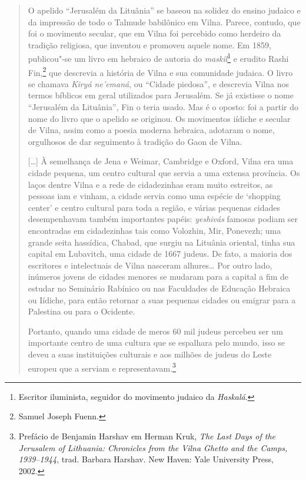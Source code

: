 \begin{quote}
O apelido ``Jerusalém da Lituânia'' se baseou na solidez do ensino
judaico e da impressão de todo o Talmude babilônico em Vilna. Parece,
contudo, que foi o movimento secular, que em Vilna foi percebido como
herdeiro da tradição religiosa, que inventou e promoveu aquele nome. Em
1859, publicou"-se um livro em hebraico de autoria do \textit{maskil}\footnote{Escritor
iluminista, seguidor do movimento judaico da \textit{Haskalá}.} e erudito Rashi Fin,\footnote{Samuel Joseph Fuenn.} que descrevia a
história de Vilna e sua comunidade judaica. O livro se chamava \textit{Kiryá
ne'emaná}, ou ``Cidade piedosa'', e descrevia Vilna nos termos bíblicos em
geral utilizados para Jerusalém. Se já existisse o nome ``Jerusalém da
Lituânia'', Fin o teria usado. Mas é o oposto: foi a partir do nome do
livro que o apelido se originou. Os movimentos iídiche e secular de
Vilna, assim como a poesia moderna hebraica, adotaram o nome, orgulhosos
de dar seguimento à tradição do Gaon de Vilna.

[\ldots{}] À semelhança de Jena e Weimar, Cambridge e Oxford, Vilna era
uma cidade pequena, um centro cultural que servia a uma extensa
província. Os laços dentre Vilna e a rede de cidadezinhas eram muito
estreitos, as pessoas iam e vinham, a cidade servia como uma espécie de
`shopping center' e centro cultural para toda a região, e várias
pequenas cidades desempenhavam também importantes papéis: \textit{yeshivás}
famosas podiam ser encontradas em cidadezinhas tais como Volozhin, Mir,
Ponevezh; uma grande seita hassídica, Chabad, que surgiu na Lituânia
oriental, tinha sua capital em Lubavitch, uma cidade de 1667 judeus. De
fato, a maioria dos escritores e intelectuais de Vilna nasceram
alhures\ldots{} Por outro lado, inúmeros jovens de cidades menores se
mudaram para a capital a fim de estudar no Seminário Rabínico ou nas
Faculdades de Educação Hebraica ou Iídiche, para então retornar a suas
pequenas cidades ou emigrar para a Palestina ou para o Ocidente.

Portanto, quando uma cidade de meros 60 mil judeus percebeu ser um
importante centro de uma cultura que se espalhara pelo mundo, isso se
deveu a suas instituições culturais e aos milhões de judeus do Leste
europeu que a serviam e representavam.\footnote{Prefácio de Benjamin Harshav em Herman Kruk, \textit{The Last Days of the Jerusalem of Lithuania: Chronicles from the Vilna Ghetto and the Camps, 1939--1944}, trad. Barbara Harshav. New Haven: Yale University Press, 2002.} 
\end{quote}

